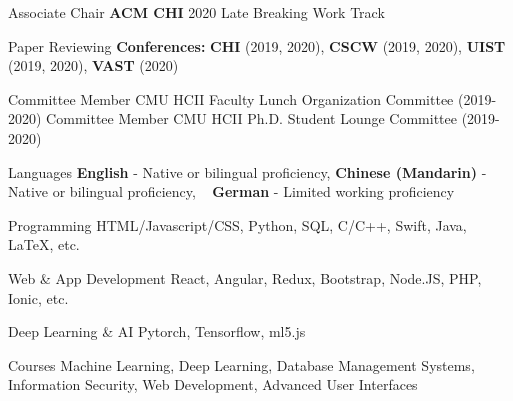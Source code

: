 
\begin{cvskills}
  \cvskill
    {Associate Chair} %
    {
      \textbf{ACM CHI} 2020 Late Breaking Work Track
    } 

  \cvskill
    {Paper Reviewing} %
    {
      \textbf{Conferences:} \textbf{CHI} (2019, 2020), \textbf{CSCW} (2019, 2020), \textbf{UIST} (2019, 2020), \textbf{VAST} (2020)
    } 

\end{cvskills}

\begin{cvskills}
  \cvskill
    {Committee Member} %
    {
      CMU HCII Faculty Lunch Organization Committee (2019-2020)
    } 
  \cvskill
    {Committee Member} %
    {
      CMU HCII Ph.D. Student Lounge Committee (2019-2020)
    } 

\end{cvskills}







\begin{cvskills}
  \cvskill
    {Languages} %
    {\textbf{English} - Native or bilingual proficiency, \textbf{Chinese (Mandarin)} - Native or bilingual proficiency, } 
  \cvskill
    {~} %
    {\textbf{German} - Limited working proficiency} 
  
  \cvskill
    {Programming} %
    {HTML/Javascript/CSS, Python, SQL, C/C++, Swift, Java, LaTeX, etc. } 

  \cvskill
    {Web \& App Development} %
    {React, Angular, Redux, Bootstrap, Node.JS, PHP, Ionic, etc.} 

  \cvskill
    {Deep Learning \& AI}
    {Pytorch, Tensorflow, ml5.js} 

  \cvskill
    {Courses} %
    {Machine Learning, Deep Learning, Database Management Systems, Information Security, Web Development, Advanced User Interfaces} 
\end{cvskills}
